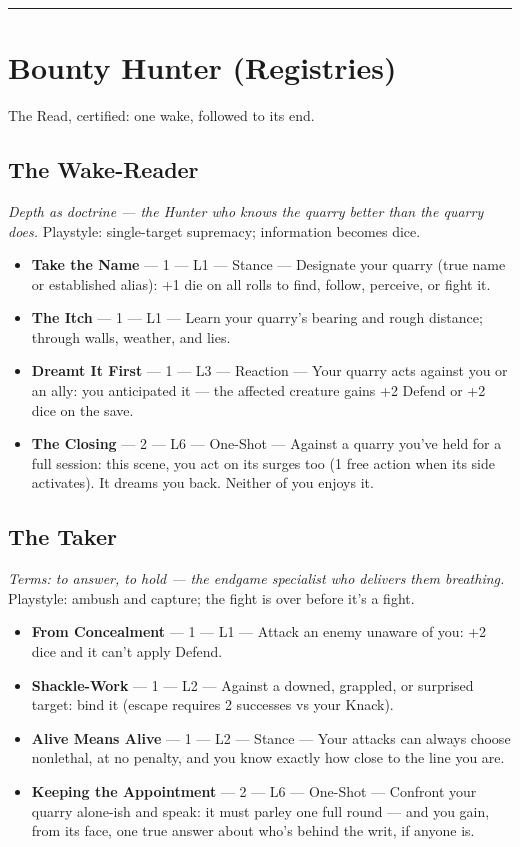 \medskip\hrule\medskip

\section{Bounty Hunter \textnormal{(Registries)}}

The Read, certified: one wake, followed to its end.

\subsection{The Wake-Reader}
\textit{Depth as doctrine --- the Hunter who knows the quarry better than the quarry does.} Playstyle: single-target supremacy; information becomes dice.
\begin{itemize}
    \item \textbf{Take the Name} --- 1 --- L1 --- Stance --- Designate your quarry (true name or established alias): +1 die on all rolls to find, follow, perceive, or fight it.
    \item \textbf{The Itch} --- 1 --- L1 --- Learn your quarry's bearing and rough distance; through walls, weather, and lies.
    \item \textbf{Dreamt It First} --- 1 --- L3 --- Reaction --- Your quarry acts against you or an ally: you anticipated it --- the affected creature gains +2 Defend or +2 dice on the save.
    \item \textbf{The Closing} --- 2 --- L6 --- One-Shot --- Against a quarry you've held for a full session: this scene, you act on its surges too (1 free action when its side activates). It dreams you back. Neither of you enjoys it.
\end{itemize}

\subsection{The Taker}
\textit{Terms: to answer, to hold --- the endgame specialist who delivers them breathing.} Playstyle: ambush and capture; the fight is over before it's a fight.
\begin{itemize}
    \item \textbf{From Concealment} --- 1 --- L1 --- Attack an enemy unaware of you: +2 dice and it can't apply Defend.
    \item \textbf{Shackle-Work} --- 1 --- L2 --- Against a downed, grappled, or surprised target: bind it (escape requires 2 successes vs your Knack).
    \item \textbf{Alive Means Alive} --- 1 --- L2 --- Stance --- Your attacks can always choose nonlethal, at no penalty, and you know exactly how close to the line you are.
    \item \textbf{Keeping the Appointment} --- 2 --- L6 --- One-Shot --- Confront your quarry alone-ish and speak: it must parley one full round --- and you gain, from its face, one true answer about who's behind the writ, if anyone is.
\end{itemize}

